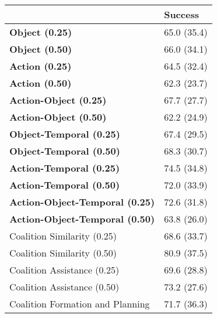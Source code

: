 \begin{tabular}{ll}
\hline
                                        & Success     \\
\hline
 \textbf{Object (0.25)}                 & 65.0 (35.4) \\
 \textbf{Object (0.50)}                 & 66.0 (34.1) \\
 \textbf{Action (0.25)}                 & 64.5 (32.4) \\
 \textbf{Action (0.50)}                 & 62.3 (23.7) \\
 \textbf{Action-Object (0.25)}          & 67.7 (27.7) \\
 \textbf{Action-Object (0.50)}          & 62.2 (24.9) \\
 \textbf{Object-Temporal (0.25)}        & 67.4 (29.5) \\
 \textbf{Object-Temporal (0.50)}        & 68.3 (30.7) \\
 \textbf{Action-Temporal (0.25)}        & 74.5 (34.8) \\
 \textbf{Action-Temporal (0.50)}        & 72.0 (33.9) \\
 \textbf{Action-Object-Temporal (0.25)} & 72.6 (31.8) \\
 \textbf{Action-Object-Temporal (0.50)} & 63.8 (26.0) \\
 Coalition Similarity (0.25)            & 68.6 (33.7) \\
 Coalition Similarity (0.50)            & 80.9 (37.5) \\
 Coalition Assistance (0.25)            & 69.6 (28.8) \\
 Coalition Assistance (0.50)            & 73.2 (27.6) \\
 Coalition Formation and Planning       & 71.7 (36.3) \\
\hline
\end{tabular}
